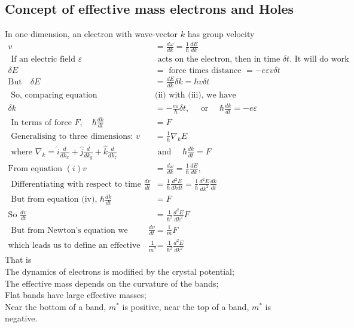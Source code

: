 \subsection{Concept of effective mass electrons and Holes}
In one dimension, an electron with wave-vector $k$ has group velocity
\begin{align*}
v&=\frac{d \omega}{d k}=\frac{1}{\hbar} \frac{d E}{d k}\\
\text { If an electric field } \varepsilon &\text { acts on the electron, then in time } \delta t \text {. It will do work }\\
\delta E&=\text { force times distance }=-e \varepsilon v \delta t \\
\text{But}\quad \delta E&=\frac{d E}{d k} \delta k=\hbar v \delta t\\
\text { So, comparing equation  }&\text{(ii) with (iii), we have}\\
\delta k&=-\frac{e \varepsilon}{\hbar} \delta t, \quad \text { or } \quad \hbar \frac{d k}{d t}=-e \varepsilon\\
\text { In terms of force } F, \quad \hbar \frac{d k}{d t}&=F\\
\text { Generalising to three dimensions: } v&=\frac{1}{\hbar} \nabla_{k} E\\
\text { where } \nabla_{k}=\hat{i} \frac{d}{d k_{x}}+\hat{j} \frac{d}{d k_{y}}+\hat{k} \frac{d}{d k_{z}} \quad &\text { and } \quad \hbar \frac{d k}{d t}=F\\
\text{From equation }
(i) v&=\frac{d \omega}{d k}=\frac{1}{\hbar} \frac{d E}{d k},\\
\text { Differentiating with respect to time } \frac{d v}{d t}&=\frac{1}{\hbar} \frac{d^{2} E}{d k d t}=\frac{1}{\hbar} \frac{d^{2} E}{d k^{2}} \frac{d k}{d t}\\
\text { But from equation (iv), } \hbar \frac{d k}{d t}&=F\\
\text{So }
\frac{d v}{d t}&=\frac{1}{\hbar^{2}} \frac{d^{2} E}{d k^{2}} F\\
\text { But from Newton's equation we expect } \frac{d v}{d t}&=\frac{1}{m} F\\
\text{which leads us to define an effective mass }
\frac{1}{m^{*}}&=\frac{1}{\hbar^{2}} \frac{d^{2} E}{d k^{2}}
\end{align*}
That is\\
The dynamics of electrons is modified by the crystal potential;\\
The effective mass depends on the curvature of the bands;\\
Flat bands have large effective masses;\\
Near the bottom of a band, $m^{*}$ is positive, near the top of a band, $m^{*}$ is negative.\\
